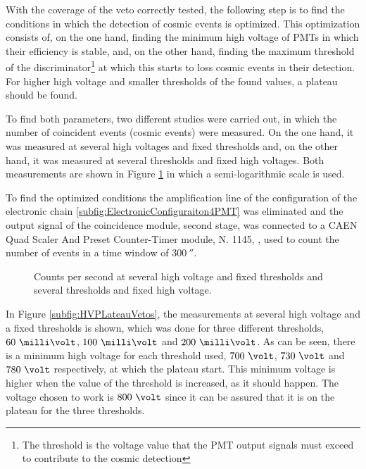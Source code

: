 With the coverage of the veto correctly tested, the following step is to find the conditions in which the detection of cosmic events is optimized. This optimization consists of, on the one hand, finding the minimum high voltage of PMTs in which their efficiency is stable, and, on the other hand, finding the maximum threshold of the discriminator\footnote{The threshold is the voltage value that the PMT output signals must exceed to contribute to the cosmic detection} at which this starts to loss cosmic events in their detection. For higher high voltage and smaller thresholds of the found values, a plateau should be found.

To find both parameters, two different studies were carried out, in which the number of coincident events (cosmic events) were measured. On the one hand, it was measured at several high voltages and fixed thresholds and, on the other hand, it was measured at several thresholds and fixed high voltages. Both measurements are shown in Figure \ref{fig:HVandThresholdsPLateaus} in which a semi-logarithmic scale is used.

To find the optimized conditions the amplification line of the configuration of the electronic chain \ref{subfig:ElectronicConfiguraiton4PMT} was eliminated and the output signal of the coincidence module, second stage, was connected to a CAEN Quad Scaler And Preset Counter-Timer module, N. 1145, \cite{ScalerDataSheet}, used to count the number of events in a time window of $300~\second$.

\begin{figure}[]
 \centering
    \newline
 \caption{Counts per second at several high voltage and fixed thresholds and several thresholds and fixed high voltage.}
 \label{fig:HVandThresholdsPLateaus}
\end{figure}

In Figure \ref{subfig:HVPLateauVetos}, the measurements at several high voltage and a fixed thresholds is shown, which was done for three different thresholds, $60~\milli\volt$, $100~\milli\volt$ and $200~\milli\volt$. As can be seen, there is a minimum high voltage for each threshold used, $700~\volt$, $730~\volt$ and $780~\volt$ respectively, at which the plateau start. This minimum voltage is higher when the value of the threshold is increased, as it should happen. The voltage chosen to work is $800~\volt$ since it can be assured that it is on the plateau for the three thresholds.

